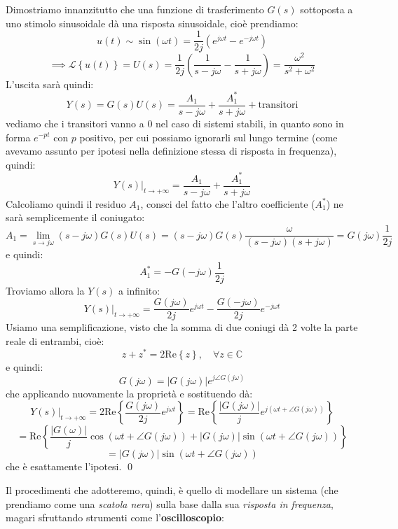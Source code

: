 \documentclass[a4paper,11pt]{article}
\begin{document}
Dimostriamo innanzitutto che una funzione di trasferimento $G(s)$ sottoposta a uno stimolo sinusoidale dà una risposta sinusoidale, cioè prendiamo:
$$
u(t) \sim \sin(\omega t) = \frac{1}{2j} \left( e^{j \omega t} - e^{-j \omega t} \right)
$$
$$
\implies \mathcal{L}\left\{u(t)\right\} = U(s) = \frac{1}{2j} \left( \frac{1}{s- j\omega} - \frac{1}{s + j\omega} \right) = \frac{\omega^2}{s^2 + \omega^2}
$$
L'uscita sarà quindi:
$$
Y(s) = G(s) U(s) = \frac{A_1}{s - j \omega} + \frac{A_1^*}{s + j \omega} + \text{transitori}
$$
vediamo che i transitori vanno a $0$ nel caso di sistemi stabili, in quanto sono in forma $e^{-pt}$ con $p$ positivo, per cui possiamo ignorarli sul lungo termine (come avevamo assunto per ipotesi nella definizione stessa di risposta in frequenza), quindi:
$$
Y(s) \Big|_{t \rightarrow +\infty} = \frac{A_1}{s - j \omega} + \frac{A_1^*}{s + j \omega}
$$
Calcoliamo quindi il residuo $A_1$, consci del fatto che l'altro coefficiente ($A_1^*$) ne sarà semplicemente il coniugato:
$$
A_1 = \lim_{s \rightarrow j \omega} (s - j \omega) G(s) U(s) = (s - j \omega) G(s) \frac{\omega}{(s - j \omega)(s + j \omega)} = G(j \omega) \frac{1}{2j}
$$
e quindi:
$$
A_1^* = -G(-j \omega) \frac{1}{2j}
$$
Troviamo allora la $Y(s)$ a infinito:
$$
Y(s) \Big|_{t \rightarrow +\infty} = \frac{G(j\omega)}{2j} e^{j \omega t} - \frac{G(- j\omega)}{2j} e^{-j \omega t}
$$
Usiamo una semplificazione, visto che la somma di due coniugi dà 2 volte la parte reale di entrambi, cioè:
$$
z + z^* = 2 \mathrm{Re}\left\{z\right\}, \quad \forall z \in \mathbb{C}
$$
e quindi:
$$
G(j \omega) = |G(j \omega)| e^{j \angle G(j \omega)}
$$
che applicando nuovamente la proprietà e sostituendo dà:
$$
Y(s) \Big|_{t \rightarrow +\infty} = 2 \mathrm{Re} \left\{ \frac{G(j \omega)}{2j} e^{j \omega t} \right\} = \mathrm{Re} \left\{ \frac{|G(j \omega)|}{j} e^{j(\omega t + \angle G(j \omega))} \right\}
$$
$$
= \mathrm{Re} \left\{ \frac{|G(\omega)|}{j} \cos(\omega t + \angle G(j \omega)) + |G(j \omega)| \sin(\omega t + \angle G(j \omega)) \right\}
$$
$$
=|G(j \omega)| \sin(\omega t + \angle G(j \omega))
$$
che è esattamente l'ipotesi. \qed

\par\smallskip

Il procedimenti che adotteremo, quindi, è quello di modellare un sistema (che prendiamo come una \textit{scatola nera}) sulla base dalla sua \textit{risposta in frequenza}, magari sfruttando strumenti come l'\textbf{oscilloscopio}:

\begin{center}
\end{center}
\end{document}
